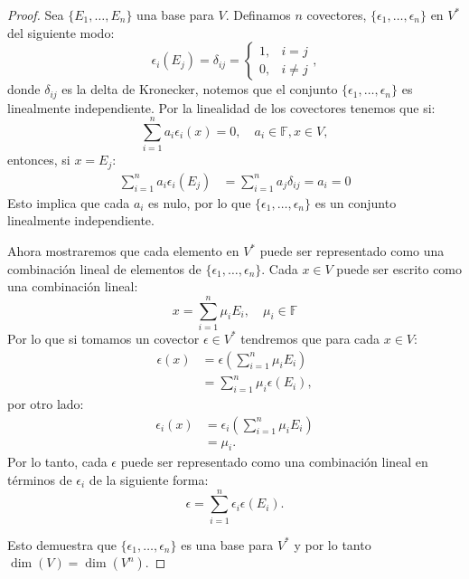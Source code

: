 \begin{proof}
	Sea $\{E_1, \dots, E_n\}$ una base para $V$. Definamos $n$ covectores, $\{\epsilon_1, \dots, \epsilon_n\}$ en $V^{*}$ del siguiente modo:
	\[
		\epsilon_i(E_j) = \delta_{ij} = \begin{cases}
			1, & i = j    \\
			0, & i \neq j
		\end{cases},
	\]
	donde $\delta_{ij}$ es la delta de Kronecker, notemos que el conjunto $\{\epsilon_1, \dots, \epsilon_n\}$ es linealmente independiente. Por la linealidad de los covectores tenemos que si:
	\[
		\sum_{i=1}^{n} a_i \epsilon_i(x) = 0, \quad a_{i} \in \mathbb{F}, x \in V,
	\]
	entonces, si $x = E_j$:
	\begin{align*}
		\sum_{i=1}^n a_i \epsilon_i (E_j) & = \sum_{i=1}^n a_j \delta_{ij} = a_i = 0
	\end{align*}
	Esto implica que cada $a_i$ es nulo, por lo que $\{\epsilon_1, \dots, \epsilon_n\}$ es un conjunto linealmente independiente.

	Ahora mostraremos que cada elemento en $V^{*}$ puede ser representado como una combinación lineal de elementos de $\{\epsilon_1, \dots, \epsilon_n\}$. Cada $x \in V$ puede ser escrito como una combinación lineal:
	\[
		x = \sum_{i=1}^{n} \mu_{i} E_i, \quad \mu_i \in \mathbb{F}
	\]
	Por lo que si tomamos un covector $\epsilon \in V^{*}$ tendremos que para cada $x \in V$:
	\begin{align*}
		\epsilon(x) & = \epsilon
		\left (\sum_{i=1}^{n} \mu_i E_i \right)                          \\
		            & = \sum_{i=1}^{n} \mu_i \epsilon \left(E_i \right),
	\end{align*}
	por otro lado:
	\begin{align*}
		\epsilon_i(x) & = \epsilon_i\left(\sum_{i=1}^{n} \mu_i E_i\right) \\
		              & = \mu_i.
	\end{align*}
	Por lo tanto, cada $\epsilon$ puede ser representado como una combinación lineal en términos de $\epsilon_i$ de la siguiente forma:
	\[
		\epsilon = \sum_{i=1}^{n} \epsilon_i \epsilon(E_i).
	\]

	Esto demuestra que $\{\epsilon_1, \dots, \epsilon_n\}$ es una base para $V^{*}$ y por lo tanto $\dim(V) = \dim(V^{n})$.
\end{proof}

